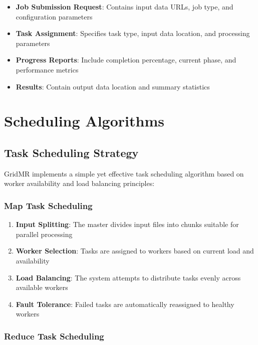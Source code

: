 \documentclass[11pt,letterpaper,oneside]{article}
\begin{document}
\begin{itemize}
    \item \textbf{Job Submission Request}: Contains input data URLs, job type, and configuration parameters
    \item \textbf{Task Assignment}: Specifies task type, input data location, and processing parameters
    \item \textbf{Progress Reports}: Include completion percentage, current phase, and performance metrics
    \item \textbf{Results}: Contain output data location and summary statistics
\end{itemize}


\section{Scheduling Algorithms}

\subsection{Task Scheduling Strategy}

GridMR implements a simple yet effective task scheduling algorithm based on worker availability and load balancing principles:

\subsubsection{Map Task Scheduling}

\begin{enumerate}
    \item \textbf{Input Splitting}: The master divides input files into chunks suitable for parallel processing
    \item \textbf{Worker Selection}: Tasks are assigned to workers based on current load and availability
    \item \textbf{Load Balancing}: The system attempts to distribute tasks evenly across available workers
    \item \textbf{Fault Tolerance}: Failed tasks are automatically reassigned to healthy workers
\end{enumerate}

\subsubsection{Reduce Task Scheduling}
\end{document}
